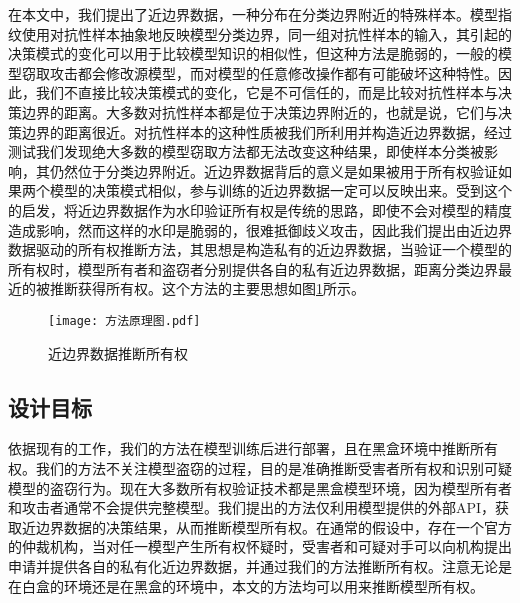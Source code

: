 在本文中，我们提出了近边界数据，一种分布在分类边界附近的特殊样本。模型指纹\cite{cao2021ipguard}使用对抗性样本抽象地反映模型分类边界，同一组对抗性样本的输入，其引起的决策模式的变化可以用于比较模型知识的相似性，但这种方法是脆弱的，一般的模型窃取攻击都会修改源模型，而对模型的任意修改操作都有可能破坏这种特性。因此，我们不直接比较决策模式的变化，它是不可信任的，而是比较对抗性样本与决策边界的距离。大多数对抗性样本都是位于决策边界附近的，也就是说，它们与决策边界的距离很近。对抗性样本的这种性质被我们所利用并构造近边界数据，经过测试我们发现绝大多数的模型窃取方法都无法改变这种结果，即使样本分类被影响，其仍然位于分类边界附近。近边界数据背后的意义是如果被用于所有权验证如果两个模型的决策模式相似，参与训练的近边界数据一定可以反映出来。受到这个的启发，将近边界数据作为水印验证所有权是传统的思路，即使不会对模型的精度造成影响，然而这样的水印是脆弱的，很难抵御歧义攻击，因此我们提出由近边界数据驱动的所有权推断方法，其思想是构造私有的近边界数据，当验证一个模型的所有权时，模型所有者和盗窃者分别提供各自的私有近边界数据，距离分类边界最近的被推断获得所有权。这个方法的主要思想如图\ref{方法原理图}所示。

\begin{figure}[htbp]%
	\centering
	\texttt{[image: 方法原理图.pdf]}
	\setlength{\abovecaptionskip}{5mm} %
	\caption{近边界数据推断所有权}
	\label{方法原理图}
\end {figure}

\subsection{设计目标}

依据现有的工作，我们的方法在模型训练后进行部署，且在黑盒环境中推断所有权。我们的方法不关注模型盗窃的过程，目的是准确推断受害者所有权和识别可疑模型的盗窃行为。现在大多数所有权验证技术都是黑盒模型环境，因为模型所有者和攻击者通常不会提供完整模型。我们提出的方法仅利用模型提供的外部API，获取近边界数据的决策结果，从而推断模型所有权。在通常的假设中，存在一个官方的仲裁机构，当对任一模型产生所有权怀疑时，受害者和可疑对手可以向机构提出申请并提供各自的私有化近边界数据，并通过我们的方法推断所有权。注意无论是在白盒的环境还是在黑盒的环境中，本文的方法均可以用来推断模型所有权。


